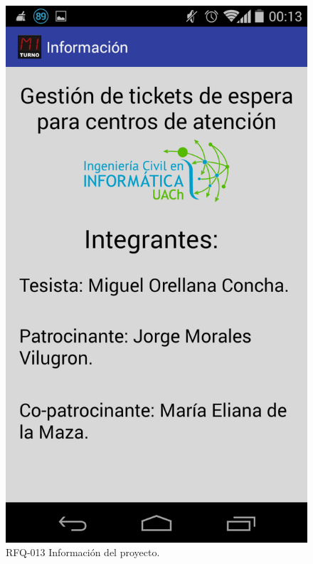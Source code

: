 \begin{figure}[H]
\centering
\includegraphics[scale=0.20]{images/capitulo6/rfq013.png}
\caption{RFQ-013 Información del proyecto.}
\label{rfq013}
\end{figure}

